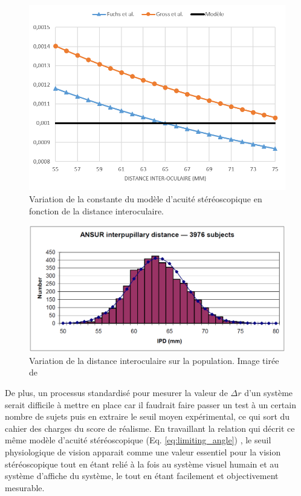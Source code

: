 	\begin{figure}
		\centering
		\includegraphics[scale=1]{Figures/FractionVariation}
		\caption{Variation de la constante du modèle d'acuité stéréoscopique en fonction de la distance interoculaire.}
		\label{fig:variation_constante_dio}
	\end{figure}
	
	\begin{figure}
		\centering
		\includegraphics[scale=.5]{Figures/ANSURIPD}
		\caption{Variation de la distance interoculaire sur la population. Image tirée de \citep{dodgson_variation_2004}}
		\label{fig:variation_dio_population}
	\end{figure}
	
	\par De plus, un processus standardisé pour mesurer la valeur de $\Delta r$ d'un système serait difficile à mettre en place car il faudrait faire passer un test à un certain nombre de sujets puis en extraire le seuil moyen expérimental, ce qui sort du cahier des charges du score de réalisme. En travaillant la relation qui décrit ce même modèle d'acuité stéréoscopique (Eq. \ref{eq:limiting_angle}) \citep{gross_human_2008}, le seuil physiologique de vision apparait comme une valeur essentiel pour la vision stéréoscopique tout en étant relié à la fois au système visuel humain et au système d'affiche du système, le tout en étant facilement et objectivement mesurable. 
	
